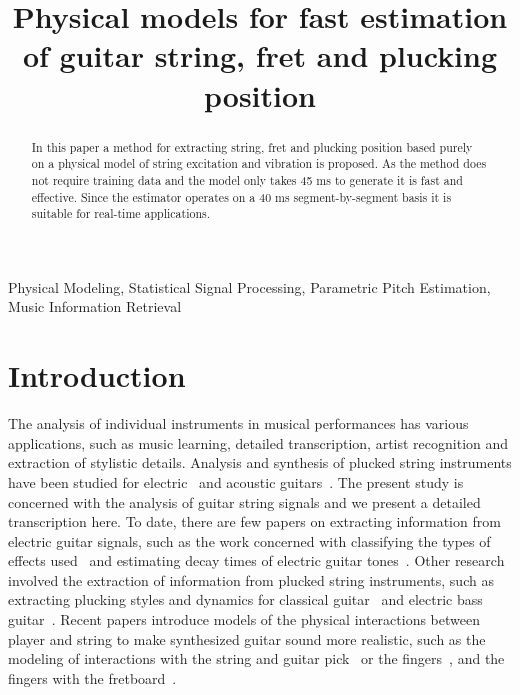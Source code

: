 \documentclass{article}
\title{Physical models for fast estimation of guitar string, fret and plucking position}
\begin{document}
\ninept
\maketitle
\begin{sloppy}
\begin{abstract}
  
  In this paper a method for extracting string, fret and plucking position based purely on a physical model of string excitation and vibration is proposed. As the method does not require training data and the model only takes 45 ms to generate it is fast and effective. Since the estimator operates on a 40 ms segment-by-segment basis it is suitable for real-time applications.
\end{abstract}
%
\begin{keywords}
 Physical Modeling, Statistical Signal Processing, Parametric Pitch Estimation, Music Information Retrieval\vspace{-.8mm}
 \end{keywords}
%
\section{Introduction}
\label{sec:intro}
The analysis of individual instruments in musical performances has various applications, such as music learning, detailed transcription, artist recognition and extraction of stylistic details. Analysis and synthesis of plucked string instruments have been studied for electric~\cite{sullivan1990extending} and acoustic guitars~\cite{Karjalainen93towardshigh-quality,laurson2001methods}. The present study is concerned with the analysis of guitar string signals and we present a detailed transcription here. To date, there are few papers on extracting information from electric guitar signals, such as the work concerned with classifying the types of effects used~\cite{abesser2012feature} and estimating decay times of electric guitar tones~\cite{pate2014predicting}. Other research involved the extraction of information from plucked string instruments, such as extracting plucking styles and dynamics for classical guitar~\cite{erkut2000extraction} and electric bass guitar~\cite{abesser:automatic_string_detection_ml}. Recent papers introduce models of the physical interactions between player and string to make synthesized guitar sound more realistic, such as the modeling of interactions with the string and guitar pick~\cite{germain2009synthesis,evangelista2010player} or the fingers~\cite{poirot_nonlinear_interactions_with_string}, and the fingers with the fretboard~\cite{bilbao2015numerical}. 


\end{sloppy}
\end{document}
